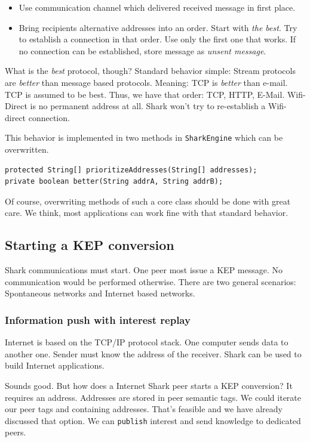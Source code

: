 \begin{itemize}
    \item Use communication channel which delivered received message in first place.
\item
Bring recipients alternative addresses into an order. Start with {\it the best}. Try to establish a connection in that order. Use only the first one that works. If no connection can be established, store message as {\it unsent message}.
\end{itemize}

What is the {\it best} protocol, though? Standard behavior simple: Stream protocols are {\it better} than message based protocols. Meaning: TCP is {\it better} than e-mail. TCP is assumed to be best. Thus, we have that order: TCP, HTTP, E-Mail. Wifi-Direct is no permanent address at all. Shark won't try to re-establish a Wifi-direct connection.

This behavior is implemented in two methods in {\tt SharkEngine} which can be overwritten.

\begin{verbatim}
protected String[] prioritizeAddresses(String[] addresses);
private boolean better(String addrA, String addrB);
\end{verbatim}

Of course, overwriting methods of such a core class should be done with great care. We think, most applications can work fine with that standard behavior.

\subsection{Starting a KEP conversion}
Shark communications must start. One peer most issue a KEP message. No communication would be performed otherwise. There are two general scenarios: Spontaneous networks and Internet based networks.

\subsubsection{Information push with interest replay}
Internet is based on the TCP/IP protocol stack. One computer sends data to another one. Sender must know the address of the receiver. Shark can be used to build Internet applications.

Sounds good. But how does a Internet Shark peer starts a KEP conversion? It requires an address. Addresses are stored in peer semantic tags. We could iterate our peer tags and containing addresses. That's feasible and we have already discussed that option. We can {\tt publish} interest and send knowledge to dedicated peers. 

